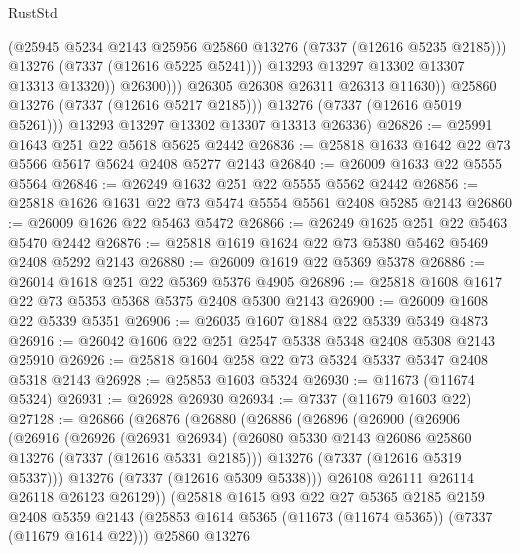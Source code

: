 \begin{lexlean}{RustStd}
\begin{coremodule}
                          (@25945 @5234 @2143 @25956 @25860 @13276 (@7337 (@12616 @5235 @2185)))
                          @13276
                          (@7337 (@12616 @5225 @5241)))
                        @13293
                        @13297
                        @13302
                        @13307
                        @13313
                        @13320))
                    @26300)))
              @26305
              @26308
              @26311
              @26313
              @11630))
          @25860
          @13276
          (@7337 (@12616 @5217 @2185)))
        @13276
        (@7337 (@12616 @5019 @5261)))
      @13293
      @13297
      @13302
      @13307
      @13313
      @26336)
@26826 := @25991 @1643 @251 @22 @5618 @5625 @2442
@26836 := @25818 @1633 @1642 @22 @73 @5566 @5617 @5624 @2408 @5277 @2143
@26840 := @26009 @1633 @22 @5555 @5564
@26846 := @26249 @1632 @251 @22 @5555 @5562 @2442
@26856 := @25818 @1626 @1631 @22 @73 @5474 @5554 @5561 @2408 @5285 @2143
@26860 := @26009 @1626 @22 @5463 @5472
@26866 := @26249 @1625 @251 @22 @5463 @5470 @2442
@26876 := @25818 @1619 @1624 @22 @73 @5380 @5462 @5469 @2408 @5292 @2143
@26880 := @26009 @1619 @22 @5369 @5378
@26886 := @26014 @1618 @251 @22 @5369 @5376 @4905
@26896 := @25818 @1608 @1617 @22 @73 @5353 @5368 @5375 @2408 @5300 @2143
@26900 := @26009 @1608 @22 @5339 @5351
@26906 := @26035 @1607 @1884 @22 @5339 @5349 @4873
@26916 := @26042 @1606 @22 @251 @2547 @5338 @5348 @2408 @5308 @2143 @25910
@26926 := @25818 @1604 @258 @22 @73 @5324 @5337 @5347 @2408 @5318 @2143
@26928 := @25853 @1603 @5324
@26930 := @11673 (@11674 @5324)
@26931 := @26928 @26930
@26934 := @7337 (@11679 @1603 @22)
@27128 := @26866
    (@26876
      (@26880
        (@26886
          (@26896
            (@26900
              (@26906
                (@26916
                  (@26926
                    (@26931 @26934)
                    (@26080 @5330 @2143 @26086 @25860 @13276 (@7337 (@12616 @5331 @2185)))
                    @13276
                    (@7337 (@12616 @5319 @5337)))
                  @13276
                  (@7337 (@12616 @5309 @5338)))
                @26108
                @26111
                @26114
                @26118
                @26123
                @26129))
            (@25818
              @1615
              @93
              @22
              @27
              @5365
              @2185
              @2159
              @2408
              @5359
              @2143
              (@25853 @1614 @5365 (@11673 (@11674 @5365)) (@7337 (@11679 @1614 @22)))
              @25860
              @13276

\end{coremodule}
\end{lexlean}
